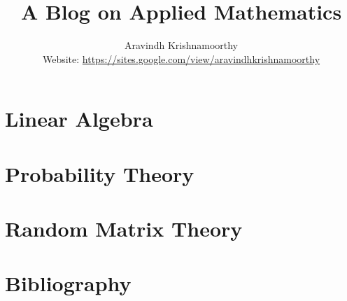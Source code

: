 \documentclass[a4paper,dvipsnames]{report}
\title{A Blog on Applied Mathematics}
\author{Aravindh Krishnamoorthy\\\small Website: \url{https://sites.google.com/view/aravindhkrishnamoorthy}}
\begin{document}
\maketitle
\tableofcontents

\chapter{Linear Algebra}






\chapter{Probability Theory}








\chapter{Random Matrix Theory}





% 
% 
\chapter{Bibliography}
\printbibliography
\end{document}
